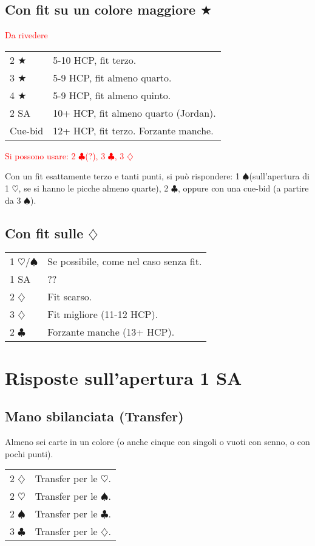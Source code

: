 \documentclass[a4paper,10pt]{article}
\renewcommand{\c}{$\clubsuit$\xspace}
\renewcommand{\d}{$\diamondsuit$\xspace}
\newcommand{\h}{$\heartsuit$\xspace}
\newcommand{\s}{$\spadesuit$\xspace}
\renewcommand{\j}{$\bigstar$\xspace}
\newcommand{\sa}{SA\xspace}
\newcommand{\smallspace}{\vskip0.3cm}
\newcommand{\note}[1]{\textcolor{red}{#1}}
\newenvironment{twocol}
  {\smallspace\noindent\begin{tabular}{l p{0.8\textwidth}}}
  {\end{tabular}\smallspace}
\begin{document}
\subsection{Con fit su un colore maggiore \j}

\note{Da rivedere}
\begin{twocol}
 2 \j  & 5-10 HCP, fit terzo.\\
 3 \j  & 5-9 HCP, fit almeno quarto.\\
 4 \j  & 5-9 HCP, fit almeno quinto.\\
 2 \sa & 10+ HCP, fit almeno quarto (Jordan).\\
 Cue-bid & 12+ HCP, fit terzo. Forzante manche.
\end{twocol}

\note{Si possono usare: 2 \c (?), 3 \c, 3 \d}

Con un fit esattamente terzo e tanti punti, si pu\`o rispondere: 1 \s (sull'apertura di 1 \h, se si hanno le picche almeno quarte), 2 \c, oppure con una cue-bid (a partire da 3 \s).


\subsection{Con fit sulle \d}

\begin{twocol}
 1 \h/\s & Se possibile, come nel caso senza fit.\\
 1 \sa & ??\\
 2 \d  & Fit scarso.\\
 3 \d  & Fit migliore (11-12 HCP).\\
 2 \c  & Forzante manche (13+ HCP).\\
\end{twocol}



\pagebreak

\section{Risposte sull'apertura 1 SA}

\subsection{Mano sbilanciata (Transfer)}

Almeno sei carte in un colore (o anche cinque con singoli o vuoti con senno, o con pochi punti).

\begin{twocol}
 2 \d & Transfer per le \h.\\
 2 \h & Transfer per le \s.\\
 2 \s & Transfer per le \c.\\
 3 \c & Transfer per le \d.\\
\end{twocol}
\end{document}
